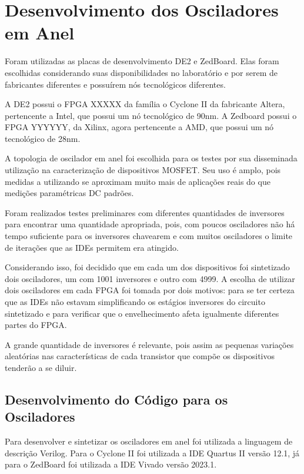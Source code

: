 \section{Desenvolvimento dos Osciladores em Anel}

Foram utilizadas as placas de desenvolvimento DE2 e ZedBoard. Elas foram escolhidas considerando suas disponibilidades no laboratório e por serem de fabricantes diferentes e possuírem nós tecnológicos diferentes.

A DE2 possui o FPGA XXXXX da família o Cyclone II da fabricante Altera, pertencente a Intel, que possui um nó tecnológico de 90nm. A Zedboard possui o FPGA YYYYYY, da Xilinx, agora pertencente a AMD, que possui um nó tecnológico de 28nm.

A topologia de oscilador em anel foi escolhida para os testes por sua disseminada utilização na caracterização de dispositivos MOSFET. Seu uso é amplo, pois medidas a utilizando se aproximam muito mais de aplicações reais do que medições paramétricas DC padrões.

Foram realizados testes preliminares com diferentes quantidades de inversores para encontrar uma quantidade apropriada, pois, com poucos osciladores não há tempo suficiente para os inversores chavearem e com muitos osciladores o limite de iterações que as IDEs permitem era atingido.

Considerando isso, foi decidido que em cada um dos dispositivos foi sintetizado dois osciladores, um com 1001 inversores e outro com 4999. A escolha de utilizar dois osciladores em cada FPGA foi tomada por dois motivos: para se ter certeza que as IDEs não estavam simplificando os estágios inversores do circuito sintetizado e para verificar que o envelhecimento afeta igualmente diferentes partes do FPGA.

A grande quantidade de inversores é relevante, pois assim as pequenas variações aleatórias nas características de cada transistor que compõe os dispositivos tenderão a se diluir.

\subsection{Desenvolvimento do Código para os Osciladores}

Para desenvolver e sintetizar os osciladores em anel foi utilizada a linguagem de descrição Verilog. Para o Cyclone II foi utilizada a IDE Quartus II versão 12.1, já para o ZedBoard foi utilizada a IDE Vivado versão 2023.1.


